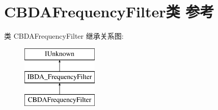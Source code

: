 \hypertarget{class_c_b_d_a_frequency_filter}{}\section{C\+B\+D\+A\+Frequency\+Filter类 参考}
\label{class_c_b_d_a_frequency_filter}
类 C\+B\+D\+A\+Frequency\+Filter 继承关系图\+:\begin{figure}[H]
\begin{center}
\leavevmode
\includegraphics[height=3.000000cm]{class_c_b_d_a_frequency_filter}
\end{center}
\end{figure}
